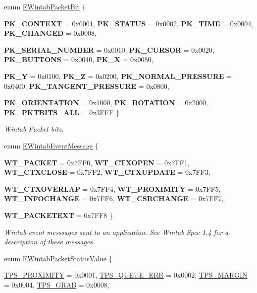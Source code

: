 \begin{DoxyCompactItemize}
enum \hyperlink{namespace_wintab_d_n_a0244b62cdae8bfd39a52f0656ae7d184}{EWintabPacketBit} \{ \par
{\bfseries PK\_\-CONTEXT} =  0x0001, 
{\bfseries PK\_\-STATUS} =  0x0002, 
{\bfseries PK\_\-TIME} =  0x0004, 
{\bfseries PK\_\-CHANGED} =  0x0008, 
\par
{\bfseries PK\_\-SERIAL\_\-NUMBER} =  0x0010, 
{\bfseries PK\_\-CURSOR} =  0x0020, 
{\bfseries PK\_\-BUTTONS} =  0x0040, 
{\bfseries PK\_\-X} =  0x0080, 
\par
{\bfseries PK\_\-Y} =  0x0100, 
{\bfseries PK\_\-Z} =  0x0200, 
{\bfseries PK\_\-NORMAL\_\-PRESSURE} =  0x0400, 
{\bfseries PK\_\-TANGENT\_\-PRESSURE} =  0x0800, 
\par
{\bfseries PK\_\-ORIENTATION} =  0x1000, 
{\bfseries PK\_\-ROTATION} =  0x2000, 
{\bfseries PK\_\-PKTBITS\_\-ALL} =  0x3FFF
 \}
\begin{DoxyCompactList}\small\item\em Wintab Packet bits. \item\end{DoxyCompactList}\item 
enum \hyperlink{namespace_wintab_d_n_a4b98724153acf19dc7b44dc911e7fd0d}{EWintabEventMessage} \{ \par
{\bfseries WT\_\-PACKET} =  0x7FF0, 
{\bfseries WT\_\-CTXOPEN} =  0x7FF1, 
{\bfseries WT\_\-CTXCLOSE} =  0x7FF2, 
{\bfseries WT\_\-CTXUPDATE} =  0x7FF3, 
\par
{\bfseries WT\_\-CTXOVERLAP} =  0x7FF4, 
{\bfseries WT\_\-PROXIMITY} =  0x7FF5, 
{\bfseries WT\_\-INFOCHANGE} =  0x7FF6, 
{\bfseries WT\_\-CSRCHANGE} =  0x7FF7, 
\par
{\bfseries WT\_\-PACKETEXT} =  0x7FF8
 \}
\begin{DoxyCompactList}\small\item\em Wintab event messsages sent to an application. See Wintab Spec 1.4 for a description of these messages. \item\end{DoxyCompactList}\item 
enum \hyperlink{namespace_wintab_d_n_afe14d17b83fb34685a298d857c203cac}{EWintabPacketStatusValue} \{ \par
\hyperlink{namespace_wintab_d_n_afe14d17b83fb34685a298d857c203cac}{TPS\_\-PROXIMITY} =  0x0001, 
\hyperlink{namespace_wintab_d_n_afe14d17b83fb34685a298d857c203cac}{TPS\_\-QUEUE\_\-ERR} =  0x0002, 
\hyperlink{namespace_wintab_d_n_afe14d17b83fb34685a298d857c203cac}{TPS\_\-MARGIN} =  0x0004, 
\hyperlink{namespace_wintab_d_n_afe14d17b83fb34685a298d857c203cac}{TPS\_\-GRAB} =  0x0008, 

\end{DoxyCompactItemize}
